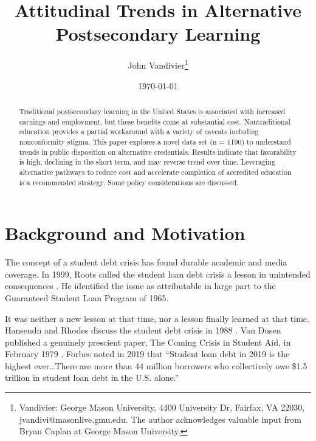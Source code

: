 \documentclass[AER]{/Users/zyl357/Documents/GitHub/research-dissertation-case-for-alt-ed/papers/alt-ed-survey/aea-latex-templates/AEA}
\begin{document}
\title{Attitudinal Trends in Alternative Postsecondary Learning}
\author{John Vandivier\thanks{Vandivier: George Mason University, 4400 University Dr, Fairfax, VA 22030, jvandivi@masonlive.gmu.edu. The author acknowledges valuable input from Bryan Caplan at George Mason University.}}
\date{\today}

\begin{abstract}
Traditional postsecondary learning in the United States is associated
with increased earnings and employment, but these benefits come at
substantial cost. Nontraditional education provides a partial workaround
with a variety of caveats including nonconformity stigma. This paper
explores a novel data set (n = 1190) to understand trends in public
disposition on alternative credentials. Results indicate that
favorability is high, declining in the short term, and may reverse trend
over time. Leveraging alternative pathways to reduce cost and accelerate
completion of accredited education is a recommended strategy. Some
policy considerations are discussed.
\end{abstract}

\maketitle

\section{Background and Motivation}

The concept of a student debt crisis has found durable academic and media
coverage. In 1999, Roots called the student loan debt crisis a lesson in
unintended consequences \cite{roots1999student}. He identified the issue as attributable in large
part to the Guaranteed Student Loan Program of 1965.

It was neither a new lesson at that time, nor a lesson finally learned at
that time. Hansendn and Rhodes discuss the student debt crisis in 1988 \cite{hansendn1988student}.
Van Dusen published a genuinely prescient paper, The Coming Crisis in
Student Aid, in February 1979 \cite{van1979coming}. Forbes noted in 2019\cite{friedman2018student} that “Student loan
debt in 2019 is the highest ever…There are more than 44 million borrowers
who collectively owe \$1.5 trillion in student loan debt in the U.S.
alone.”
\end{document}
